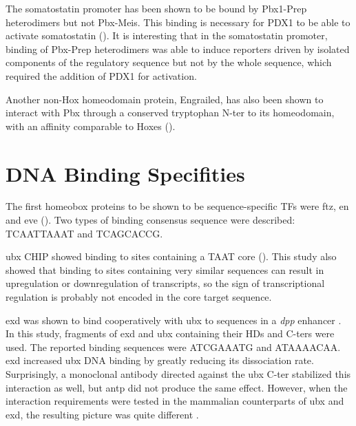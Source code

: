 The somatostatin promoter has been shown to be bound by Pbx1-Prep heterodimers but not Pbx-Meis. This binding is necessary for PDX1 to be able to activate somatostatin (\cite{Goudet1999}). It is interesting that in the somatostatin promoter, binding of Pbx-Prep heterodimers was able to induce reporters driven by isolated components of the regulatory sequence but not by the whole sequence, which required the addition of PDX1 for activation. 

Another non-Hox homeodomain protein, Engrailed, has also been shown to interact with Pbx through a conserved tryptophan \ac{N-ter} to its homeodomain, with an affinity comparable to Hoxes (\cite{Peltenburg1996}).





\section{DNA Binding Specifities}
\label{sec:specificites}
		
The first homeobox proteins to be shown to be sequence-specific \acp{TF} were \ac{ftz}, \ac{en} and \ac{eve} (\cite{Desplan1988,Hoey1988,Hoey1988a}). Two types of binding consensus sequence were described: TCAATTAAAT and TCAGCACCG.
		
\ac{ubx} \ac{CHIP} showed binding to sites containing a TAAT core (\cite{Gould1990}). This study also showed that binding to sites containing very similar sequences can result in upregulation or downregulation of transcripts, so the sign of transcriptional regulation is probably not encoded in the core target sequence.


\ac{exd} was shown to bind cooperatively with \ac{ubx} to sequences in a \textit{dpp} enhancer \parencite{Chan1994}. In this study, fragments of \ac{exd} and \ac{ubx} containing their \acp{HD} and \acp{C-ter} were used. The reported binding sequences were ATCGAAATG and ATAAAACAA. \ac{exd} increased \ac{ubx} DNA binding by greatly reducing its dissociation rate. Surprisingly, a monoclonal antibody directed against the \ac{ubx} \ac{C-ter} stabilized this interaction as well, but \ac{antp} did not produce the same effect. However, when the interaction requirements were tested in the mammalian counterparts of \ac{ubx} and \ac{exd}, the resulting picture was quite different \parencite{Chang1995}.%

